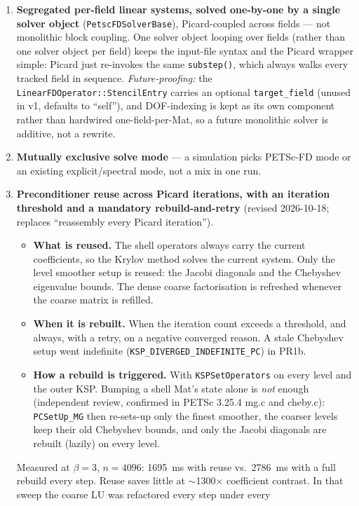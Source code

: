 \documentclass[11pt]{article}
\begin{document}
\begin{enumerate}[leftmargin=*]
\item \textbf{Segregated per-field linear systems, solved one-by-one by a
single solver object} (\texttt{PetscFDSolverBase}), Picard-coupled across
fields --- not monolithic block coupling. One solver object looping over
fields (rather than one solver object per field) keeps the input-file
syntax and the Picard wrapper simple: Picard just re-invokes the same
\texttt{substep()}, which always walks every tracked field in sequence.
\textit{Future-proofing:} the \texttt{LinearFDOperator::StencilEntry} carries
an optional \texttt{target\_field} (unused in v1, defaults to ``self''), and
DOF-indexing is kept as its own component rather than hardwired
one-field-per-Mat, so a future monolithic solver is additive, not a rewrite.
\item \textbf{Mutually exclusive solve mode} --- a simulation picks PETSc-FD
mode or an existing explicit/spectral mode, not a mix in one run.
\item \textbf{Preconditioner reuse across Picard iterations, with an
iteration threshold and a mandatory rebuild-and-retry} (revised 2026-10-18;
replaces ``reassembly every Picard iteration'').
\begin{itemize}
\item \textbf{What is reused.} The shell operators always carry the current
coefficients, so the Krylov method solves the current system. Only the
level smoother setup is reused: the Jacobi diagonals and the Chebyshev
eigenvalue bounds. The dense coarse factorisation is refreshed whenever the
coarse matrix is refilled.
\item \textbf{When it is rebuilt.} When the iteration count exceeds a
threshold, and always, with a retry, on a negative converged reason. A stale
Chebyshev setup went indefinite (\texttt{KSP\_DIVERGED\_INDEFINITE\_PC}) in
PR1b.
\item \textbf{How a rebuild is triggered.} With \texttt{KSPSetOperators} on
every level and the outer KSP. Bumping a shell Mat's state alone is
\emph{not} enough (independent review, confirmed in PETSc 3.25.4 mg.c and
cheby.c): \texttt{PCSetUp\_MG} then re-sets-up only the finest smoother, the
coarser levels keep their old Chebyshev bounds, and only the Jacobi
diagonals are rebuilt (lazily) on every level.
\end{itemize}
Measured at $\beta=3$, $n=4096$: 1695~ms with reuse vs.\ 2786~ms with a full
rebuild every step. Reuse saves little at $\sim$1300$\times$ coefficient
contrast. In that sweep the coarse LU was refactored every step under every

\end{enumerate}
\end{document}
